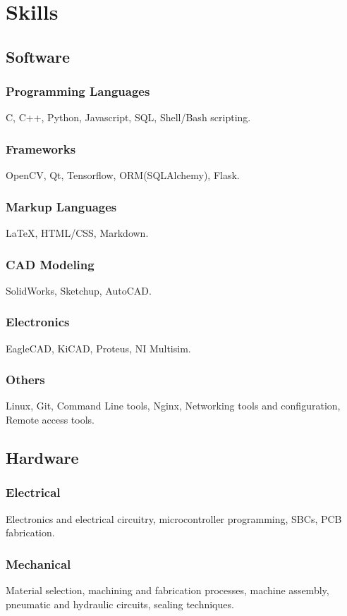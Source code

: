 \documentclass[a4paper]{article}
\begin{document}
	\section{Skills}
		\subsection{Software}
			\subsubsection{Programming Languages}
			C, C++, Python, Javascript, SQL, Shell/Bash scripting.
			\subsubsection{Frameworks}
			OpenCV, Qt, Tensorflow, ORM(SQLAlchemy), Flask.
			\subsubsection{Markup Languages}
			{\LaTeX}, HTML/CSS, Markdown.
			\subsubsection{CAD Modeling}	
			SolidWorks, Sketchup, AutoCAD.
			\subsubsection{Electronics}	
			EagleCAD, KiCAD, Proteus, NI Multisim.
			\subsubsection{Others}
			Linux, Git, Command Line tools, Nginx, Networking tools and configuration, Remote access tools.
		\subsection{Hardware}
			\subsubsection{Electrical}
			Electronics and electrical circuitry, microcontroller programming, SBCs, PCB fabrication.
			\subsubsection{Mechanical}
			Material selection, machining and fabrication processes, machine assembly, pneumatic and hydraulic circuits, sealing techniques.
\end{document}
